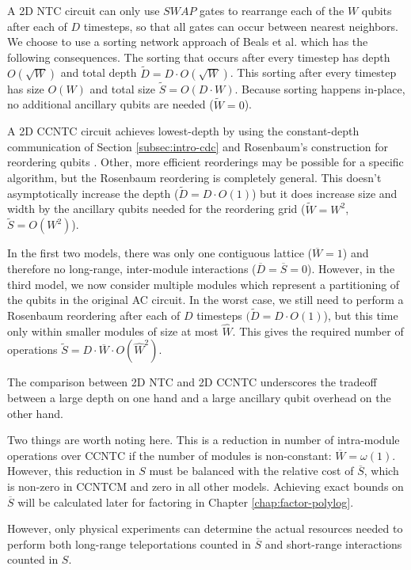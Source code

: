 A \textsf{2D NTC} circuit can only
use $SWAP$ gates to rearrange each of the $W$ qubits after each of $D$
timesteps, so that all gates can occur between nearest neighbors. We choose
to use a sorting network approach of Beals et al. \cite{Beals2012} which
has the following consequences. The sorting that occurs after every timestep
has depth $O(\sqrt{W})$ and total depth $\tilde{D} = D\cdot O(\sqrt{W})$.
This sorting after every timestep has size $O(W)$ and total size
$\tilde{S} = O(D\cdot W)$. Because sorting happens in-place,
no additional ancillary qubits are needed ($\tilde{W} = 0$). 

A \textsf{2D CCNTC} circuit achieves lowest-depth by using the constant-depth
communication of Section \ref{subsec:intro-cdc} and Rosenbaum's
construction for reordering qubits \cite{Rosenbaum2012}. Other, more
efficient reorderings may be possible for a specific algorithm, but
the Rosenbaum reordering is completely general. This doesn't
asymptotically increase the depth ($\tilde{D} = D\cdot O(1)$) but it does
increase size and width by the ancillary qubits needed for the reordering
grid ($\tilde{W} = W^2$, $\tilde{S} = O(W^2)$).

In the first two models, there was only one contiguous lattice
($\overline{W} = 1$) and therefore no long-range, inter-module interactions
($\overline{D} = \overline{S} = 0$). However, in the third model, we now
consider multiple modules which represent a partitioning of the qubits
in the original \textsf{AC} circuit. In the worst case, we still need to
perform a Rosenbaum reordering after each of $D$ timesteps $(\tilde{D} = D\cdot O(1)$), but this time
only within smaller modules of size at most $\hat{W}$. This gives the
required number of operations $\tilde{S} = D\cdot \overline{W} \cdot O(\hat{W}^2)$.

The comparison between \textsf{2D NTC} and \textsf{2D CCNTC} underscores the
tradeoff between a large depth on one hand and a large ancillary qubit
overhead on the other hand.

Two things are worth noting here.
This is a reduction in number of intra-module operations over \textsf{CCNTC} 
if the number of modules is non-constant:
$\overline{W} = \omega(1)$. However, this reduction in $S$ must be
balanced with the relative cost of $\overline{S}$, which is non-zero in
\textsf{CCNTCM} and zero in all other models. Achieving exact bounds on
$\overline{S}$ will be calculated later for factoring in Chapter
\ref{chap:factor-polylog}.

However, only
physical experiments can determine the actual resources needed to
perform both long-range teleportations counted in $\overline{S}$ and
short-range interactions counted in $S$.

